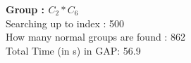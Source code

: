 \textbf{Group : $C_2*C_6$}\\
Searching up to index : 500\\
How many normal groups are found : 862\\
Total Time (in s) in GAP: 56.9\\
